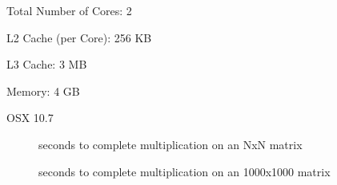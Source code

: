 \documentclass[letterpaper,10pt]{article} %
\begin{document}
Total Number of Cores: 2

L2 Cache (per Core): 256 KB

L3 Cache: 3 MB

Memory: 4 GB

OSX 10.7


\begin{figure}[p]
		\centering
		
		\caption{seconds to complete multiplication on an NxN matrix }
		\label{runtimes}
\end{figure}


\begin{figure}[p]
		\centering
		
		\caption{seconds to complete multiplication on an 1000x1000
		matrix}
		\label{runtimes}
\end{figure}
\end{document}
